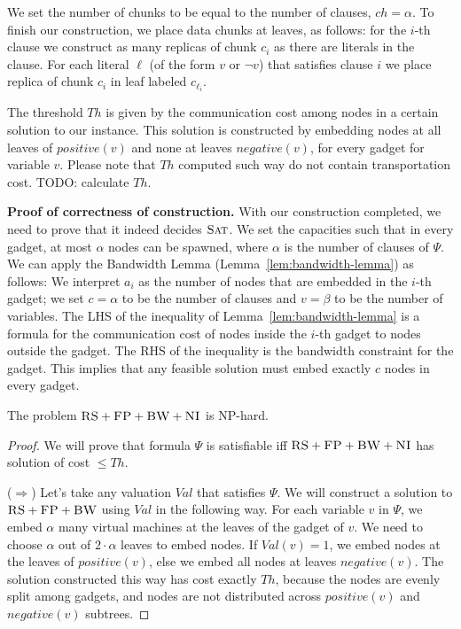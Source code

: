 \documentclass[9pt,twocolumn]{scrartcl}
\newcommand{\clauses}{\alpha}
\newcommand{\variables}{\beta}
\newcommand{\achunk}{\ensuremath{c}}
\newcommand{\CC}{\textsc{NI}}
\newcommand{\FP}{\textsc{FP}}
\newcommand{\RS}{\textsc{RS}}
\newcommand{\BW}{\textsc{BW}}
\newcommand{\SAT}{\textsc{Sat}}
\newcommand{\Formula}{\ensuremath{\Psi}}
\newcommand{\ChunkTypes}{\ensuremath{ch}}
\newcommand{\Thr}{\ensuremath{Th}}
\newcommand{\positive}{\ensuremath{positive}}
\newcommand{\negative}{\ensuremath{negative}}
\newcommand{\Val}{\ensuremath{Val}}
\begin{document}
\begin{appendix}
We set the number of chunks to be equal to the number of clauses, $\ChunkTypes =
\clauses$. To finish our construction, we place data chunks at
leaves, as follows: for the $i$-th clause we
construct as many replicas of chunk $\achunk_i$ as there are literals in the
clause. For each literal $\ell$ (of the form $v$ or $\neg v$) that satisfies clause $i$ we place
replica of chunk $\achunk_i$ in leaf labeled $\achunk_{\ell_i}$.

The threshold $\Thr$ is given by the
communication cost among nodes in
a certain solution to our instance. This solution is constructed by embedding
nodes at all leaves of $\positive(v)$ and none at leaves
$\negative(v)$, for every gadget for variable $v$. Please note that $\Thr$
computed such way do not contain transportation cost. TODO: calculate
$\Thr$.

\textbf{Proof of correctness of construction.}
With our construction completed, we need to prove that it indeed
decides $\SAT$. We set the capacities such that in every gadget,
at most $\clauses$ nodes can be spawned, where $\clauses$
is the number of clauses of $\Formula$.
We can apply the Bandwidth Lemma (Lemma~\ref{lem:bandwidth-lemma}) as follows:
We interpret $a_i$ as the
number of nodes that are embedded in the $i$-th gadget; we set $c=\clauses$
to be the number
of clauses and $v=\variables$ to be the number of variables.
The LHS of the inequality of Lemma~\ref{lem:bandwidth-lemma}
is a formula for the communication cost of nodes inside the $i$-th
gadget to nodes outside the gadget. The RHS of the inequality is the
bandwidth constraint for the gadget. This implies that
any feasible solution must embed exactly $c$ nodes in every gadget.


\begin{theorem}
The problem $\RS+\FP+\BW+\CC$ is NP-hard.
\end{theorem}
\begin{proof}
We will prove that formula $\Formula$ is satisfiable iff $\RS+\FP+\BW+\CC$ has
solution of cost $\leq \Thr$.

($\Rightarrow$) Let's take any valuation $\Val$ that satisfies $\Formula$.
We will construct a solution to $\RS+\FP+\BW$ using $\Val$ in the following way.
For each variable $v$ in $\Formula$, we embed $\clauses$ many virtual machines
at the  leaves of the gadget of $v$. We need to choose $\clauses$ out of
$2 \cdot \clauses$ leaves to embed nodes. If $\Val(v) = 1$, we embed
nodes at the leaves
of $\positive(v)$, else we embed all nodes at leaves $\negative(v)$.
The solution constructed this way has cost exactly
$\Thr$, because the nodes are evenly split among gadgets, and nodes are not
distributed across $\positive(v)$ and $\negative(v)$ subtrees.


\end{proof}
\end{appendix}
\end{document}
